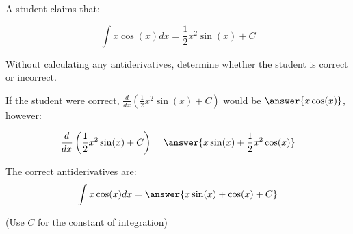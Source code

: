 \documentclass{ximera}
\author{Jim Talamo}
\begin{document}
\begin{exercise}
A student claims that:

\[
\int x \cos(x) dx = \frac{1}{2} x^2 \sin(x) +C
\]

Without calculating any antiderivatives, determine whether the student is correct or incorrect. 

\begin{multipleChoice}
\end{multipleChoice}

If the student were correct, $\frac{d}{dx} \left(\frac{1}{2} x^2 \sin(x) +C\right)$ would be $\answer{x \cos(x)}$, however:


\[
\frac{d}{dx} \left(\frac{1}{2} x^2 \sin(x) +C\right) = \answer{x \sin(x)+\frac{1}{2}x^2 \cos(x)}
\]

\begin{exercise}
The correct antiderivatives are:
\[
\int x \cos(x) dx = \answer{x \sin(x)+\cos(x) +C}
\]

(Use $C$ for the constant of integration)

\end{exercise}
\end{exercise}
\end{document}
